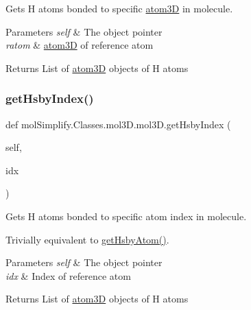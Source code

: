 Gets H atoms bonded to specific \hyperlink{namespacemolSimplify_1_1Classes_1_1atom3D}{atom3D} in molecule. 


\begin{DoxyParams}{Parameters}
{\em self} & The object pointer \\
\hline
{\em ratom} & \hyperlink{namespacemolSimplify_1_1Classes_1_1atom3D}{atom3D} of reference atom \\
\hline
\end{DoxyParams}
\begin{DoxyReturn}{Returns}
List of \hyperlink{namespacemolSimplify_1_1Classes_1_1atom3D}{atom3D} objects of H atoms 
\end{DoxyReturn}
\mbox{\label{classmolSimplify_1_1Classes_1_1mol3D_1_1mol3D_a99730d5cf790e512a55fbe0d1fd863c7}} 
\subsubsection{\texorpdfstring{get\+Hsby\+Index()}{getHsbyIndex()}}
{\footnotesize\ttfamily def mol\+Simplify.\+Classes.\+mol3\+D.\+mol3\+D.\+get\+Hsby\+Index (\begin{DoxyParamCaption}\item[{}]{self,  }\item[{}]{idx }\end{DoxyParamCaption})}



Gets H atoms bonded to specific atom index in molecule. 

Trivially equivalent to \hyperlink{classmolSimplify_1_1Classes_1_1mol3D_1_1mol3D_a232adbbe11745aac4561a15fe1850df4}{get\+Hsby\+Atom()}. 
\begin{DoxyParams}{Parameters}
{\em self} & The object pointer \\
\hline
{\em idx} & Index of reference atom \\
\hline
\end{DoxyParams}
\begin{DoxyReturn}{Returns}
List of \hyperlink{namespacemolSimplify_1_1Classes_1_1atom3D}{atom3D} objects of H atoms 
\end{DoxyReturn}
\mbox{\label{classmolSimplify_1_1Classes_1_1mol3D_1_1mol3D_aae3d38b16c8876fd11e6a170b3e18df0}} 
